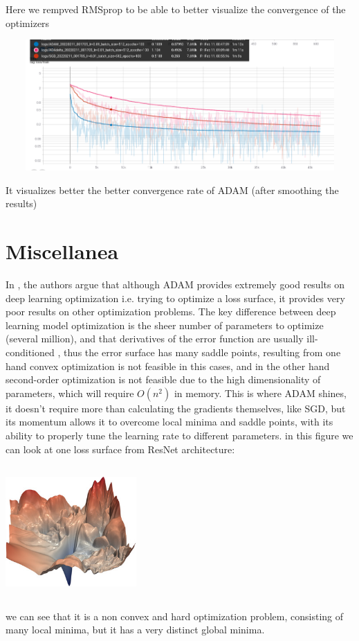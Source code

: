 \documentclass[10pt,a4paper]{article}
\begin{document}
Here we rempved RMSprop to be able to better visualize the convergence of the optimizers
\begin{center}
    \includegraphics[width=15cm, height=5cm]{train_lr=0.01_bs=512_2.png}
\end{center}
It visualizes better the better convergence rate of ADAM (after smoothing the results)
\section{Miscellanea}
In \cite{vaswani2019painless}, the authors argue that although ADAM provides extremely good results on deep learning optimization i.e. trying to optimize a loss surface, it provides very poor results on other optimization problems.
The key difference between deep learning model optimization is the sheer number of parameters to optimize (several million), and that derivatives of the error function are usually ill-conditioned \cite{li2017visualizing}, thus the error surface has many saddle points, resulting from one hand convex optimization is not feasible in this cases, and in the other hand second-order optimization is not feasible due to the high dimensionality of parameters, which will require $O(n^2)$ in memory. This is where ADAM shines, it doesn't require more than calculating the gradients themselves, like SGD, but its momentum allows it to overcome local minima and saddle points, with its ability to properly tune the learning rate to different parameters.
in this figure we can look at one loss surface from ResNet architecture:
\begin{center}
    \includegraphics[width=5cm, height=5cm]{resnet56_noshort_small.jpg}
\end{center}
we can see that it is a non convex and hard optimization problem, consisting of many local minima, but it has a very distinct global minima.


\end{document}
